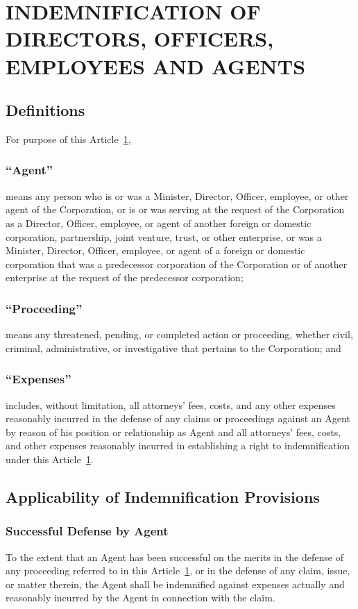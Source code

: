 \documentclass[letterpaper,titlepage]{article}
\begin{document}
\section{INDEMNIFICATION OF DIRECTORS, OFFICERS, EMPLOYEES AND AGENTS}
\label{sec:indemnificationDirectors}
\subsection{Definitions}
For purpose of this Article~\ref{sec:indemnificationDirectors},
\subsubsection{``Agent''}
\label{sec:agent}
means any person who is or was a Minister, Director, Officer, employee, or other agent of the Corporation, or is or was serving at the request of the Corporation as a Director, Officer, employee, or agent of another foreign or domestic corporation, partnership, joint venture, trust, or other enterprise, or was a Minister, Director, Officer, employee, or agent of a foreign or domestic corporation that was a predecessor corporation of the Corporation or of another enterprise at the request of the predecessor corporation;
\subsubsection{``Proceeding''}
\label{sec:proceeding}
means any threatened, pending, or completed action or proceeding, whether civil, criminal, administrative, or investigative that pertains to the Corporation; and
\subsubsection{``Expenses''}
\label{sec:expenses}
includes, without limitation, all attorneys' fees, costs, and any other
expenses reasonably incurred in the defense of any claims or proceedings
against an Agent by reason of his position or relationship as Agent and all
attorneys' fees, costs, and other expenses reasonably incurred in establishing
a right to indemnification under this Article~\ref{sec:indemnificationDirectors}.
\subsection{Applicability of Indemnification Provisions}
\label{sec:applicability}
\subsubsection{Successful Defense by Agent}
\label{sec:successfulDefense}
To the extent that an Agent has been successful on the merits in the defense of
any proceeding referred to in this Article~\ref{sec:indemnificationDirectors}, or in the defense of any claim,
issue, or matter therein, the Agent shall be indemnified against expenses
actually and reasonably incurred by the Agent in connection with the claim.
\end{document}

